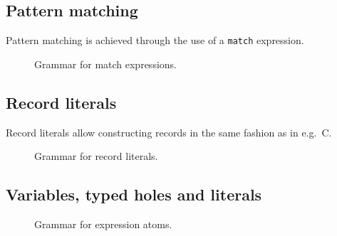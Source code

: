\subsection{Pattern matching}\label{subsec:zilch-grammar-expressions-match}

Pattern matching is achieved through the use of a \texttt{match} expression.

\begin{figure}[H]
	\centering


	\caption{Grammar for match expressions.}
	\label{fig:zilch-grammar-expressions-match-grammar}
\end{figure}

\subsection{Record literals}\label{subsec:zilch-grammar-expressions-record}

Record literals allow constructing records in the same fashion as in e.g.\ C.

\begin{figure}[H]
	\centering


	\caption{Grammar for record literals.}
	\label{fig:zilch-gramma-expressions-record-grammar}
\end{figure}

\subsection{Variables, typed holes and literals}\label{subsec:zilch-grammar-expressions-basicexpr}

\begin{figure}[H]
	\centering


	\caption{Grammar for expression atoms.}
	\label{fig:zilch-grammar-expressions-atom-grammar}
\end{figure}

